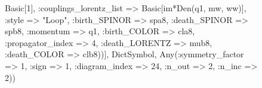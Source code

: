 \documentclass{revtex4}
\begin{document}
\begin{figure}[!htb]
\begin{center}
{Basic[1], :couplings_lorentz_list => Basic[im*Den(q1, mw, ww)], :style => "Loop", :birth_SPINOR => spa8, :death_SPINOR => spb8, :momentum => q1, :birth_COLOR => cla8, :propagator_index => 4, :death_LORENTZ => mub8, :death_COLOR => clb8))], Dict{Symbol, Any}(:symmetry_factor => 1, :sign => 1, :diagram_index => 24, :n_out => 2, :n_inc => 2)) 
}
\end{center}
\end{figure}
\end{document}
